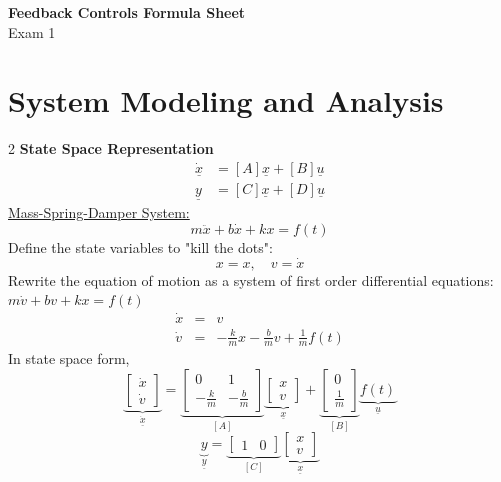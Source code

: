 \documentclass[10pt, fleqn]{article}
\begin{document}
\begin{center}
    \Large \textbf{Feedback Controls Formula Sheet} \\
    \normalsize Exam 1
\end{center}
    \section*{System Modeling and Analysis}
    \vspace{-1em}
\begin{multicols*}{2}\noindent
\textbf{State Space Representation}\\
\[\begin{aligned}
\dot{\underline{x}} &= [A]{\underline{x}} + [B]\underline{u} \\
\underline{y} &= [C]{\underline{x}} + [D]\underline{u}
\end{aligned}\]
\underline{Mass-Spring-Damper System:}
\[m\ddot{x}+ b\dot{x} + kx = f(t)\]
Define the state variables to "kill the dots":
\[x = x,\quad v=\dot{x}\]
Rewrite the equation of motion as a system of first order differential equations: $m\dot{v}+ bv + kx = f(t)$
\begin{eqnarray*}
\dot{x} &=& v \\
\dot{v} &=& -\frac{k}{m}x - \frac{b}{m}v + \frac{1}{m}f(t)
\end{eqnarray*}
In state space form,
\[
\underbrace{
\begin{bmatrix}
\dot{x}\\
\dot{v}
\end{bmatrix}
}_{\dot{\underline{x}}}
=
\underbrace{
\begin{bmatrix}
0 & 1\\
-\frac{k}{m} & -\frac{b}{m}
\end{bmatrix}
}_{[A]}
\underbrace{
\begin{bmatrix}
x\\
v
\end{bmatrix}
}_{\underline{x}}
+
\underbrace{
\begin{bmatrix}
0\\
\frac{1}{m}
\end{bmatrix}
}_{[B]}
\underbrace{f(t)}_{\underline{u}}
\]
\[
\underbrace{y}_{\underline{y}}
=
\underbrace{
\begin{bmatrix}
1 & 0
\end{bmatrix}
}_{[C]}
\underbrace{
\begin{bmatrix}
x\\
v
\end{bmatrix}
}_{\underline{x}}
\]
\end{multicols*}
\end{document}
